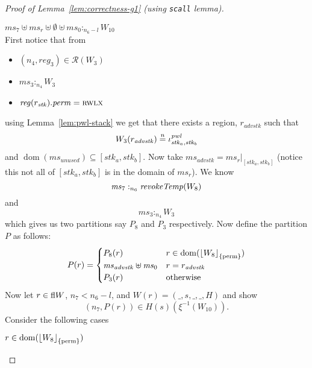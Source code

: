\documentclass[a4paper]{article}
\DeclarePairedDelimiter\floor{\lfloor}{\rfloor}
\newcommand{\nequal}[1][n]{\stackrel{\tiny{#1}}{=}}
\DeclareMathOperator{\dom}{dom}
\newcommand{\var}[1]{\mathit{#1}}
\newcommand{\hs}{\var{ms}}
\newcommand{\ms}{\hs}
\newcommand{\reg}{\var{reg}}
\newcommand{\heap}{\var{mem}}
\newcommand{\perm}{\var{perm}}
\newcommand{\adv}{\var{adv}}
\newcommand{\stk}{\var{stk}}
\newcommand{\pwl}{\var{pwl}}
\newcommand{\unused}{\var{unused}}
\newcommand{\plainfun}[2]{
  \ifthenelse{\equal{#2}{}}
  {\mathit{#1}}
  {\mathit{#1}(#2)}
}
\newcommand{\revokeTemp}[1]{\plainfun{revokeTemp}{#1}}
\newcommand{\erase}[2]{\floor*{#1}_{\{#2\}}}
\newcommand{\heapSat}[3][\heap]{#1 :_{#2} #3}
\newcommand{\memSat}[3][n]{\heapSat[#2]{#1}{#3}}
\newcommand{\asmType}{\plaindom{AsmType}}
\newcommand{\plaindom}[1]{\mathrm{#1}}
\newcommand{\intr}[2]{\mathcal{#1}}
\newcommand{\regintr}[1]{\intr{R}{#1}}
\newcommand{\stdrr}{\regintr{\asmType}}
\newcommand{\npair}[2][n]{\left(#1,#2 \right)}
\newcommand{\plainperm}[1]{\textsc{#1}}
\newcommand{\rwlx}{\plainperm{rwlx}}
\newcommand{\plainview}[1]{\mathrm{#1}}
\newcommand{\perma}{\plainview{perm}}
\begin{document}
\begin{proof}[Proof of Lemma~\ref{lem:correctness-g1} (using \texttt{scall} lemma)]
\begin{enumproof}[resume]
\begin{enumproof}
\begin{enumproof}
            \item $\memSat[n_6-l]{\ms_7 \uplus \ms_r \uplus \emptyset \uplus \ms_0}{W_{10}}$ \label{g1:memsatw10}\\
              First notice that from %
              \begin{itemize}
              \item $\npair[n_4]{\reg_3} \in \stdrr(W_3)$
              \item $\memSat[n_4]{\ms_3}{W_3}$
              \item $\reg(r_\stk).\perm = \rwlx$
              \end{itemize}
              using Lemma~\ref{lem:pwl-stack} we get that there exists a region, $r_{\adv \stk}$ such that
              \[
                W_3(r_{\adv \stk}) \nequal \iota_{\stk_a,\stk_b}^\pwl
              \]
              and $\dom(\ms_\unused) \subseteq [\stk_a,\stk_b]$. Now take $\ms_{\adv \stk} = \ms_r|_{[\stk_a,\stk_b]}$ (notice this not all of $[\stk_a,\stk_b]$ is in the domain of $\ms_r$).
              We know
              \begin{equation}
                \label{eq:g1:ms7heapsat}
                \memSat[n_6]{\ms_7}{\revokeTemp{W_8}}
              \end{equation}
              and
              \begin{equation}
                \label{eq:g1:ms3heapsat}
                \memSat[n_4]{\ms_3}{W_3}
              \end{equation}
              which gives us two partitions say $P_8$ and $P_3$ respectively. Now define the partition $P$ as follows:
              \[
                P(r) =
                \begin{cases}
                  P_8(r) & r \in \dom(\erase{W_8}{\perma}) \\
                  \ms_{\adv \stk} \uplus \ms_0 & r = r_{\adv \stk}\\
                  P_3(r) & \text{otherwise}
                \end{cases}
              \]
              Now let $r \in \active{W}$, $n_7 < n_6 - l$, and $W(r) = (\_,s,\_,\_,H)$ and show
              \[
                \npair[n_7]{P(r)} \in H(s)(\xi^{-1}(W_{10})).
              \]
              Consider the following cases
              \begin{enumproof}
                \item $r \in \dom(\erase{W_8}{\perma})$ \\

\end{enumproof}
\end{enumproof}
\end{enumproof}
\end{enumproof}
\end{proof}
\end{document}
